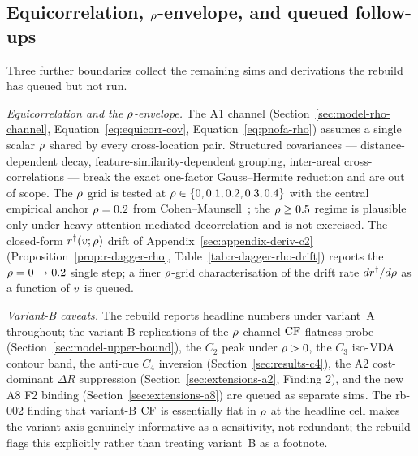 \subsection{Equicorrelation, $\rho$-envelope, and queued follow-ups}
\label{sec:limitations-followups}

Three further boundaries collect the remaining sims and derivations
the rebuild has queued but not run.

\emph{Equicorrelation and the $\rho$-envelope.}  The A1 channel
(Section~\ref{sec:model-rho-channel},
Equation~\eqref{eq:equicorr-cov},
Equation~\eqref{eq:pnofa-rho}) assumes a single scalar $\rho$
shared by every cross-location pair.  Structured covariances —
distance-dependent decay, feature-similarity-dependent grouping,
inter-areal cross-correlations
\cite{RuffCohen2016,Srinath2021} — break the exact one-factor
Gauss--Hermite reduction and are out of scope.  The $\rho$ grid is
tested at $\rho \in \{0, 0.1, 0.2, 0.3, 0.4\}$ with the central
empirical anchor $\rho = 0.2$ from
Cohen--Maunsell~\cite{CohenMaunsell2009}; the $\rho \ge 0.5$ regime
is plausible only under heavy attention-mediated decorrelation and
is not exercised.  The closed-form $r^{\dagger}(v; \rho)$ drift
of Appendix~\ref{sec:appendix-deriv-c2}
(Proposition~\ref{prop:r-dagger-rho}, Table~\ref{tab:r-dagger-rho-drift})
reports the $\rho = 0 \to 0.2$ single step; a finer $\rho$-grid
characterisation of the drift rate $dr^{\dagger}/d\rho$ as a function
of $v$ is queued.

\emph{Variant-B caveats.}  The rebuild reports headline numbers
under variant~A throughout; the variant-B replications of the
$\rho$-channel $\mathrm{CF}$ flatness probe
(Section~\ref{sec:model-upper-bound}), the $C_2$ peak under
$\rho > 0$, the $C_3$ iso-$\mathrm{VDA}$ contour band, the anti-cue $C_4$
inversion (Section~\ref{sec:results-c4}), the A2 cost-dominant
$\Delta R$ suppression
(Section~\ref{sec:extensions-a2}, Finding 2), and the new A8 F2
binding (Section~\ref{sec:extensions-a8}) are queued as separate
sims.  The rb-002 finding that variant-B $\mathrm{CF}$ is essentially flat
in $\rho$ at the headline cell makes the variant axis genuinely
informative as a sensitivity, not redundant; the rebuild flags this
explicitly rather than treating variant~B as a footnote.

